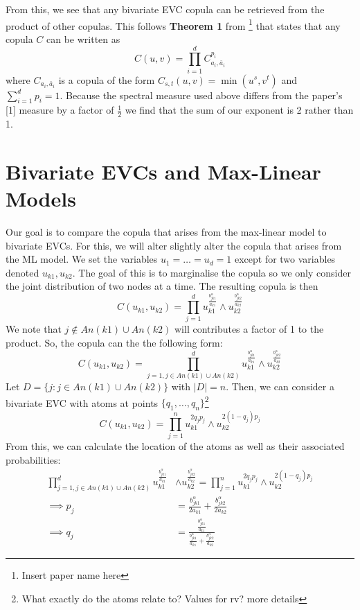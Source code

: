\documentclass[12pt]{article}
\newcommand{\ds}{\displaystyle}
\theoremstyle{definition}
\theoremstyle{definition}
\begin{document}
From this, we see that any bivariate EVC copula can be retrieved from the product of other copulas. This follows \textbf{Theorem 1} from \footnote{Insert paper name here} that states that any copula $C$ can be written as 
$$C(u,v)= \prod_{i=1}^dC_{a_i,\bar{a}_i}^{p_i}$$
where $C_{a_i,\bar{a}_i}$ is a copula of the form $C_{s,t}(u,v)=\min(u^s,v^t)$ and $\sum_{i=1}^dp_i=1$. Because the spectral measure used above differs from the paper's [1] measure by a factor of $\frac{1}{2}$ we find that the sum of our exponent is 2 rather than 1.
\newpage
\section{Bivariate EVCs and Max-Linear Models}
Our goal is to compare the copula that arises from the max-linear model to bivariate EVCs. For this, we will alter slightly alter the copula that arises from the ML model. We set the variables $u_1=\hdots=u_d=1$ except for two variables denoted $u_{k1},u_{k2}$. The goal of this is to marginalise the copula so we only consider the joint distribution of two nodes at a time. The resulting copula is then 
$$C(u_{k1},u_{k2})=\prod_{j=1}^du_{k1}^{\frac{b_{jk1}^\alpha}{a_{k1}}}\wedge u_{k2}^{\frac{b_{jk2}^\alpha}{a_{k2}}}$$
We note that $j\notin An(k1)\cup An(k2)$ will contributes a factor of 1 to the product. So, the copula can the the following form:
$$C(u_{k1},u_{k2})=\prod_{j=1,j\in An(k1)\cup An(k2) }^du_{k1}^{\frac{b_{jk1}^\alpha}{a_{k1}}}\wedge u_{k2}^{\frac{b_{jk2}^\alpha}{a_{k2}}}$$
Let $D=\{j:j\in An(k1)\cup An(k2)\}$ with $|D|=n$. Then, we can consider a bivariate EVC with atoms at points $\ds\{q_1,\hdots,q_n\}$\footnote{What exactly do the atoms relate to? Values for rv? more details }
$$C(u_{k1},u_{k2})= \prod_{j=1}^n u_{k1}^{2q_jp_j}\wedge u_{k2}^{2(1-q_j)p_j}$$
From this, we can calculate the location of the atoms as well as their associated probabilities:
\begin{align*}
    \prod_{j=1,j\in An(k1)\cup An(k2)}^du_{k1}^{\frac{b_{jk1}^\alpha}{a_{k1}}}&\wedge u_{k2}^{\frac{b_{jk2}^\alpha}{a_{k2}}}=\prod_{j=1}^n u_{k1}^{2q_jp_j}\wedge u_{k2}^{2(1-q_j)p_j}\\
    \implies p_j&=\frac{b_{jk1}^\alpha}{2a_{k1}}+\frac{b_{jk2}^\alpha}{2a_{k2}}\\
    \implies q_j&=\frac{\frac{b_{jk1}^\alpha}{a_{k1}}}{\frac{b_{jk1}^\alpha}{a_{k1}}+\frac{b_{jk2}^\alpha}{a_{k2}}} \tag{2}
\end{align*}
\end{document}
